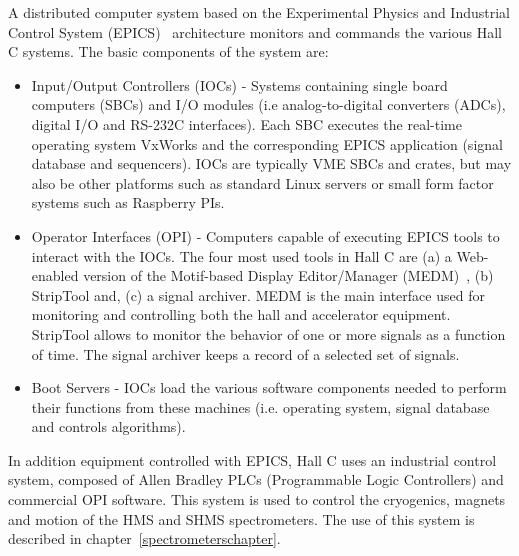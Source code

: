 A distributed computer system
based on the 
Experimental Physics and Industrial Control System 
(EPICS)~\cite{EPICSwww}
 architecture monitors and commands
the various Hall C systems. The basic components of the system are:
\begin{itemize}
\item Input/Output Controllers (IOCs) - Systems containing single
board computers (SBCs) and I/O modules
(i.e analog-to-digital converters (ADCs), digital I/O and RS-232C interfaces).
Each SBC executes the real-time operating system VxWorks and the corresponding EPICS application (signal database
and sequencers).  IOCs are typically VME SBCs and crates, but may also
be other platforms such as standard Linux servers or small form factor
systems such as Raspberry PIs.
\item Operator Interfaces (OPI) - Computers capable of executing
EPICS tools to interact with the IOCs.
The four most used tools in Hall C are (a)
a Web-enabled version of the Motif-based Display Editor/Manager (MEDM)~\cite{MEDMwww}, 
(b) StripTool and, (c) a signal archiver.
MEDM is the main interface used for monitoring and controlling both the hall and accelerator
equipment. StripTool allows to monitor 
the behavior of one or more signals as a function of time. 
The signal archiver keeps a record of a selected set of signals.
\item Boot Servers - IOCs load the various
software components needed to perform their functions from these machines (i.e. operating system,
signal database and controls algorithms).
\end{itemize}

In addition equipment controlled with EPICS, Hall C uses an industrial
control system, composed of Allen Bradley PLCs (Programmable Logic
Controllers) and commercial OPI software.  This system is used to
control the cryogenics, magnets and motion of the HMS and SHMS
spectrometers.  The use of this system is described in
chapter~\ref{spectrometerschapter}. 

